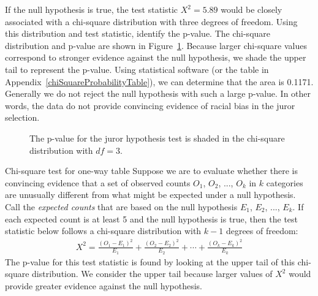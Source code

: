 \begin{examplewrap}
\begin{nexample}{If the null hypothesis is true,
    the test statistic $X^2=5.89$ would be closely
    associated with a chi-square distribution with
    three degrees of freedom.
    Using this distribution and test statistic,
    identify the p-value.}
  The chi-square distribution and p-value are shown in
  Figure~\ref{jurorHTPValueShown}.
  Because larger chi-square values correspond to stronger
  evidence against the null hypothesis, we shade the upper
  tail to represent the p-value.
  Using statistical software (or the table in
  Appendix~\ref{chiSquareProbabilityTable}),
  we can determine that the area is 0.1171.
  Generally we do not reject the null hypothesis
  with such a large p-value.
  In other words, the data do not provide convincing evidence
  of racial bias in the juror selection.
\end{nexample}
\end{examplewrap}

\begin{figure}[h]
\centering
{}
\caption{The p-value for the juror hypothesis test is shaded in the chi-square distribution with $df=3$.}
\label{jurorHTPValueShown}
\end{figure}


\begin{onebox}{Chi-square test for one-way table}
  Suppose we are to evaluate whether there is convincing
  evidence that a set of observed counts $O_1$, $O_2$, ...,
  $O_k$ in $k$ categories are unusually different from what
  might be expected under a null hypothesis.
  Call the \emph{expected counts} that are based on the null
  hypothesis $E_1$, $E_2$, ..., $E_k$.
  If each expected count is at least 5 and the null hypothesis
  is true, then the test statistic below follows a chi-square
  distribution with $k-1$ degrees of freedom:
  \begin{align*}
  X^2
    = \frac{(O_1 - E_1)^2}{E_1} +
        \frac{(O_2 - E_2)^2}{E_2} +
        \cdots +
        \frac{(O_k - E_k)^2}{E_k}
  \end{align*}
  The p-value for this test statistic is found by looking
  at the upper tail of this chi-square distribution.
  We consider the upper tail because larger values of $X^2$
  would provide greater evidence against the null hypothesis.
\end{onebox}

